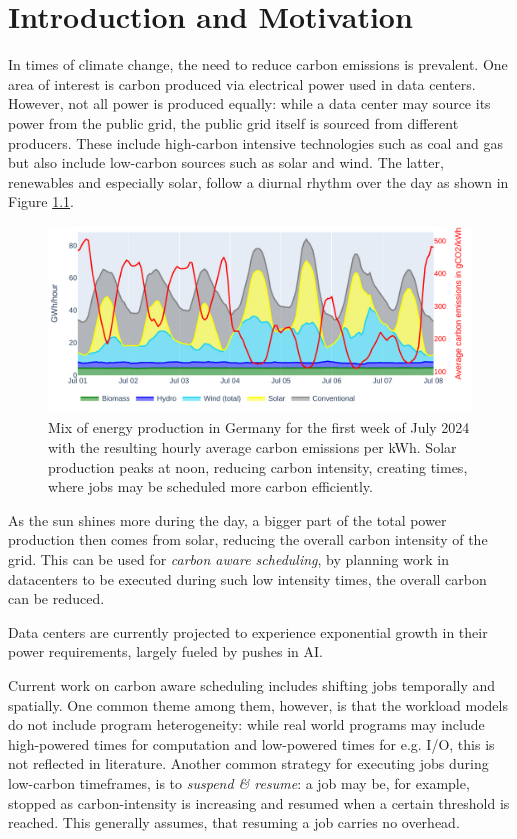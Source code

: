 \chapter{Introduction and Motivation}

In times of climate change, the need to reduce carbon emissions is prevalent. 
One area of interest is carbon produced via electrical power used in data centers. 
However, not all power is produced equally: while a data center may source its power from the public grid, the public grid itself is sourced from different producers. 
These include high-carbon intensive technologies such as coal and gas but also include low-carbon sources such as solar and wind. 
The latter, renewables and especially solar, follow a diurnal rhythm over the day as shown in Figure \ref{fig:energy_mix}.

\begin{figure}
    \includegraphics[width=\linewidth]{agorameter/energy_production_week.pdf}
    \caption[short]{Mix of energy production in Germany for the first week of July 2024 with the resulting hourly average carbon emissions per kWh. Solar production peaks at noon, reducing carbon intensity, creating times, where jobs may be scheduled more carbon efficiently.}
    \label{fig:energy_mix}
\end{figure}

As the sun shines more during the day, a bigger part of the total power production then comes from solar, reducing the overall carbon intensity of the grid.
This can be used for \emph{carbon aware scheduling}, by planning work in datacenters to be executed during such low intensity times, the overall carbon can be reduced.

Data centers are currently projected to experience exponential growth in their power requirements, largely fueled by pushes in AI.\cite{schwartz_green_2019}

Current work on carbon aware scheduling includes shifting jobs temporally and spatially. 
One common theme among them, however, is that the workload models do not include program heterogeneity: while real world programs may include high-powered times for computation and low-powered times for e.g. I/O, this is not reflected in literature. 
Another common strategy for executing jobs during low-carbon timeframes, is to \emph{suspend \& resume}: a job may be, for example, stopped as carbon-intensity is increasing and resumed when a certain threshold is reached. 
This generally assumes, that resuming a job carries no overhead. 

